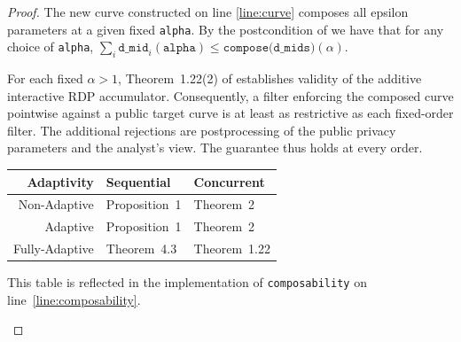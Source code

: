 \documentclass{article}
\begin{document}
\begin{proof}
  The new curve constructed on line \ref{line:curve} composes all epsilon parameters at a given fixed \texttt{alpha}.
  By the postcondition of  we have that for any choice of \texttt{alpha}, $\sum_i \texttt{d\_mid}_i(\texttt{alpha}) \le \texttt{compose(d\_mids)}(\alpha)$.

  For each fixed $\alpha>1$, Theorem~1.22(2) of \cite{haney2025concurrent} establishes validity of the additive interactive RDP accumulator.
  Consequently, a filter enforcing the composed curve pointwise against a public target curve is at least as restrictive as each fixed-order filter.
  The additional rejections are postprocessing of the public privacy parameters and the analyst's view.
  The guarantee thus holds at every order.

  \begin{center}
    \begin{tabular}{ r | l l }
      Adaptivity & Sequential & Concurrent \\
      \hline
      Non-Adaptive & Proposition~1\cite{mironov2017renyi} & Theorem~2\cite{lyu2022interactive} \\
      Adaptive & Proposition~1\cite{mironov2017renyi} & Theorem~2\cite{lyu2022interactive} \\
      Fully-Adaptive & Theorem~4.3\cite{feldman2022individual} & Theorem~1.22\cite{haney2025concurrent}
    \end{tabular}

    This table is reflected in the implementation of \texttt{composability} on line~\ref{line:composability}.
  \end{center}

\end{proof}



\end{document}
